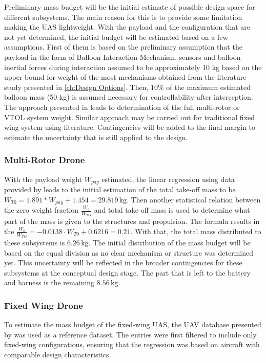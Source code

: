 Preliminary mass budget will be the initial estimate of possible design space for different subsystems. The main reason for this is to provide some limitation making the UAS lightweight. With the payload and the configuration that are not yet determined, the initial budget will be estimated based on a few assumptions. First of them is based on the preliminary assumption that the payload in the form of Balloon Interaction Mechanism, sensors and balloon inertial forces during interaction assumed to be approximately 10 kg based on the upper bound for weight of the most mechanisms obtained from the literature study presented in \autoref{ch:Design Options}. Then, $10 \%$ of the maximum estimated balloon mass (50 kg) is assumed necessary for controllability after interception. The approach presented in \cite{Gatti2017CompleteMultirotor} leads to determination of the full multi-rotor or VTOL system weight. Similar approach may be carried out for traditional fixed wing system using literature. Contingencies will be added to the final margin to estimate the uncertainty that is still applied to the design.
\vspace{-10pt}
\subsubsection{Multi-Rotor Drone}

With the payload weight $W_{pay}$ estimated, the linear regression using data provided by \cite{Gatti2017CompleteMultirotor} leads to the initial estimation of the total take-off mass to be $W_{T0}=1.891*W_{pay}+1.454=29.819 \, \text{kg}$. Then another statistical relation between the zero weight fraction $\frac{W_0}{W_{TO}}$ and total take-off mass is used to determine what part of the mass is given to the structures and propulsion. The formula results in the $ \frac{W_0}{W_{TO}}=-0.0138\cdot W_{T0}+0.6216=0.21$. With that, the total mass distributed to these subsystems is $6.26 \, \text{kg}$. The initial distribution of the mass budget will be based on the equal division as no clear mechanism or structure was determined yet. This uncertainty will be reflected in the broader contingencies for these subsystems at the conceptual design stage. The part that is left to the battery and harness is the remaining $8.56 \, \text{kg}$.
\vspace{-10pt}
\subsubsection{Fixed Wing Drone}
To estimate the mass budget of the fixed-wing UAS, the UAV database presented by \cite{Hann2020UAVDatabase} was used as a reference dataset. The entries were first filtered to include only fixed-wing configurations, ensuring that the regression was based on aircraft with comparable design characteristics.\\

